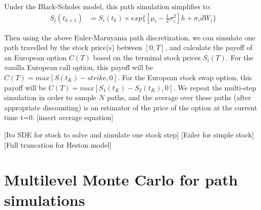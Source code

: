 \documentclass{article}
\begin{document}
	Under the Black-Scholes model, this path simulation simplifies to:
	\begin{align}
	S_i(t_{k+1}) &= S_i(t_k) \times exp\{[\mu_i - \frac{1}{2} \sigma_i^2] h + \sigma_i dW_i \}
	\end{align}
	
	Then using the above Euler-Maruyama path discretization, we can simulate one path travelled by the stock price(s) between $[0,T]$, and calculate the payoff of an European option $C(T)$ based on the terminal stock prices $S_i(T)$. For the vanilla European call option, this payoff will be $C(T)=max[S(t_K)-strike,0]$. For the European stock swap option, this payoff will be $C(T)=max[S_1(t_K)-S_2(t_K),0]$. We repeat the multi-step simulation in order to sample $N$ paths, and the average over these paths (after appropriate discounting) is an estimator of the price of the option at the current time t=0.
	[insert average equation]
	
	[Ito SDE for stock to solve and simulate one stock step]
	[Euler for simple stock]
	[Full truncation for Heston model]

\section{Multilevel Monte Carlo for path simulations}



\end{document}
